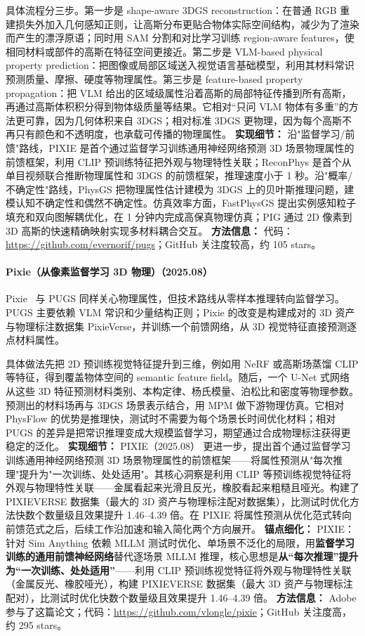 具体流程分三步。第一步是 shape-aware 3DGS reconstruction：在普通 RGB 重建损失外加入几何感知正则，让高斯分布更贴合物体实际空间结构，减少为了渲染而产生的漂浮原语；同时用 SAM 分割和对比学习训练 region-aware features，使相同材料或部件的高斯在特征空间更接近。第二步是 VLM-based physical property prediction：把图像或局部区域送入视觉语言基础模型，利用其材料常识预测质量、摩擦、硬度等物理属性。第三步是 feature-based property propagation：把 VLM 给出的区域级属性沿着高斯的局部特征传播到所有高斯，再通过高斯体积积分得到物体级质量等结果。它相对“只问 VLM 物体有多重”的方法更可靠，因为几何体积来自 3DGS；相对标准 3DGS 更物理，因为每个高斯不再只有颜色和不透明度，也承载可传播的物理属性。
\textbf{实现细节：} 沿"监督学习/前馈"路线，PIXIE 是首个通过监督学习训练通用神经网络预测 3D 场景物理属性的前馈框架，利用 CLIP 预训练特征把外观与物理特性关联；ReconPhys 是首个从单目视频联合推断物理属性和 3DGS 的前馈框架，推理速度小于 1 秒。沿"概率/不确定性"路线，PhysGS 把物理属性估计建模为 3DGS 上的贝叶斯推理问题，建模认知不确定性和偶然不确定性。仿真效率方面，FastPhysGS 提出实例感知粒子填充和双向图解耦优化，在 1 分钟内完成高保真物理仿真；PIG 通过 2D 像素到 3D 高斯的快速精确映射实现多材料耦合交互。
\textbf{方法信息：} 代码：\url{https://github.com/evernorif/pugs}；GitHub 关注度较高，约 105 stars。



\paragraph{Pixie（从像素监督学习 3D 物理）（2025.08）}
Pixie~\cite{2508_17437} 与 PUGS 同样关心物理属性，但技术路线从零样本推理转向监督学习。PUGS 主要依赖 VLM 常识和少量结构正则；Pixie 的改变是构建成对的 3D 资产与物理标注数据集 PixieVerse，并训练一个前馈网络，从 3D 视觉特征直接预测逐点材料属性。

具体做法先把 2D 预训练视觉特征提升到三维，例如用 NeRF 或高斯场蒸馏 CLIP 等特征，得到覆盖物体空间的 semantic feature field。随后，一个 U-Net 式网络从这些 3D 特征预测材料类别、本构定律、杨氏模量、泊松比和密度等物理参数。预测出的材料场再与 3DGS 场景表示结合，用 MPM 做下游物理仿真。它相对 PhysFlow 的优势是推理快，测试时不需要为每个场景长时间优化材料；相对 PUGS 的差异是把常识推理变成大规模监督学习，期望通过合成物理标注获得更稳定的泛化。
\textbf{实现细节：} PIXIE（2025.08） 更进一步，提出首个通过监督学习训练通用神经网络预测 3D 场景物理属性的前馈框架——将属性预测从"每次推理"提升为"一次训练、处处适用"。其核心洞察是利用 CLIP 等预训练视觉特征将外观与物理特性关联——金属看起来光滑且反光，橡胶看起来粗糙且哑光。构建了 PIXIEVERSE 数据集（最大的 3D 资产与物理标注配对数据集），比测试时优化方法快数个数量级且效果提升 1.46--4.39 倍。在 PIXIE 将属性预测从优化范式转向前馈范式之后，后续工作沿加速和输入简化两个方向展开。
\textbf{锚点细化：} PIXIE：针对 Sim Anything 依赖 MLLM 测试时优化、单场景不泛化的局限，用\textbf{监督学习训练的通用前馈神经网络}替代逐场景 MLLM 推理，核心思想是\textbf{从``每次推理''提升为``一次训练、处处适用''}——利用 CLIP 预训练视觉特征将外观与物理特性关联（金属反光、橡胶哑光），构建 PIXIEVERSE 数据集（最大 3D 资产与物理标注配对），比测试时优化快数个数量级且效果提升 1.46--4.39 倍。
\textbf{方法信息：} Adobe 参与了这篇论文；代码：\url{https://github.com/vlongle/pixie}；GitHub 关注度高，约 295 stars。



